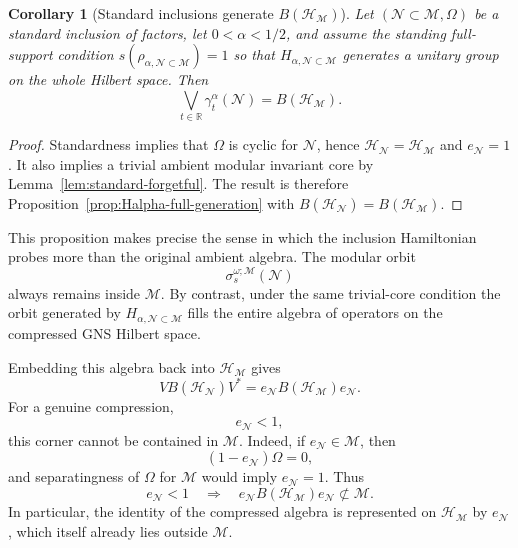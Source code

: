\documentclass[a4paper,11pt]{article}
\newtheorem{corollary}[theorem]{Corollary}
\theoremstyle{definition}
\newcommand{\mN}{\mathcal{N}}
\newcommand{\mH}{\mathcal{H}}
\newcommand{\mM}{\mathcal{M}}
\begin{document}
\begin{corollary}[Standard inclusions generate $B(\mH_{\mM})$]
\label{cor:standard-Halpha-full-generation}
Let $(\mN\subset\mM,\Omega)$ be a standard inclusion of factors,
let $0<\alpha<1/2$, and assume the standing full-support condition
$s(\rho_{\alpha,\mN\subset\mM})=1$ so that $H_{\alpha,\mN\subset\mM}$ generates a
unitary group on the whole Hilbert space. Then
\begin{equation}
    \boxed{
    \bigvee_{t\in\mathbb R}
    \gamma_t^\alpha(\mN)
    =B(\mH_{\mM}).
    }
    \label{eq:standard-Halpha-full-BHM}
\end{equation}
\end{corollary}
\begin{proof}
Standardness implies that $\Omega$ is cyclic for $\mN$, hence
$\mH_{\mN}=\mH_{\mM}$ and $e_{\mN}=1$. It also implies a trivial ambient modular invariant core by Lemma~\ref{lem:standard-forgetful}. The result is therefore
Proposition~\ref{prop:Halpha-full-generation} with
$B(\mH_{\mN})=B(\mH_{\mM})$.
\end{proof}

This proposition makes precise the sense in which the inclusion Hamiltonian
probes more than the original ambient algebra. The modular orbit
\begin{equation}
    \sigma_s^{\omega;\mM}(\mN)
\end{equation}
always remains inside $\mM$. By contrast, under the same
trivial-core condition the orbit generated by $H_{\alpha,\mN\subset\mM}$
fills the entire algebra of operators on the compressed GNS Hilbert space.

Embedding this algebra back into $\mH_{\mM}$ gives
\begin{equation}
    V B(\mH_{\mN})V^*
    =
    e_{\mN}B(\mH_{\mM})e_{\mN} .
    \label{eq:corner-BHN}
\end{equation}
For a genuine compression,
\begin{equation}
    e_{\mN}<1,
\end{equation}
this corner cannot be contained in $\mM$. Indeed, if
$e_{\mN}\in\mM$, then
\begin{equation}
    (1-e_{\mN})\Omega=0,
\end{equation}
and separatingness of $\Omega$ for $\mM$ would imply
$e_{\mN}=1$. Thus
\begin{equation}
    \boxed{
    e_{\mN}<1
    \quad\Longrightarrow\quad
    e_{\mN}B(\mH_{\mM})e_{\mN}
    \not\subset\mM.
    }
    \label{eq:corner-outside-M}
\end{equation}
In particular, the identity of the compressed algebra is represented on
$\mH_{\mM}$ by $e_{\mN}$, which itself already lies outside $\mM$.
\end{document}
